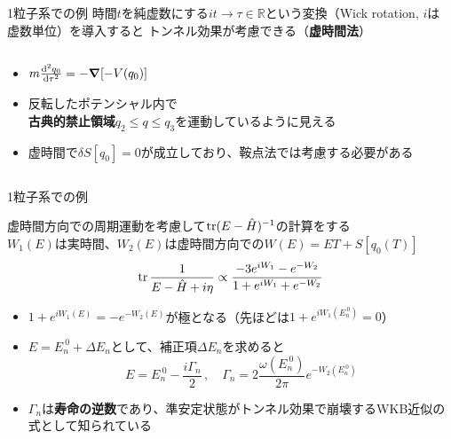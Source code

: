 \documentclass[14pt,aspectratio=169,xcolor=dvipsnames,table,dvipdfmx]{beamer}
\theoremstyle{definition}
\begin{document}
\begin{frame}{1粒子系での例}
  時間$t$を純虚数にする$it\to\tau\in \mathbb{R}$という変換（Wick rotation, $i$は\\虚数単位）を導入すると
  トンネル効果が考慮できる（\textbf{虚時間法}）
  \begin{columns}[t]
    \begin{column}{.49\textwidth}
      \begin{itemize}
        \item $m\dv[2]{q_0}{\tau} = -\grad \qty[-V(q_0)]$
        \item 反転したポテンシャル内で\\{\color{AlertOrange}\textbf{古典的禁止領域}}$q_2\leq q\leq q_3$を運動しているように見える
        \item 虚時間で$\delta S[q_0]=0$が成立しており、鞍点法では考慮する必要がある
      \end{itemize}
    \end{column}
    \begin{column}{.5\textwidth}
    \end{column}
  \end{columns}
\end{frame}

\begin{frame}{1粒子系での例}
  
  {\color{AlertOrange}虚時間方向での周期運動}を考慮して$\trace(E-\hat{H})^{-1}$の計算をする\\
  $W_1(E)$は実時間、$W_2(E)$は虚時間方向での$W(E)=ET+S[q_0(T)]$\\
  \begin{equation*}
    \trace\frac{1}{E-\hat{H}+i\eta} \propto \frac{-3e^{iW_1}-e^{-W_2}}{1+e^{iW_1}+e^{-W_2}}
  \end{equation*}
  \begin{itemize}
    \item $1+e^{iW_1(E)}=-e^{-W_2(E)}$が極となる（先ほどは$1+e^{iW_1(E_n^{~0})}=0$）
    \item $E=E_{n}^{~0}+\varDelta E_n$として、補正項$\varDelta E_n$を求めると
          \begin{equation*}
            E = E_{n}^{~0} -\frac{i\Gamma_n}{2}\,,\quad \Gamma_n = 2\frac{\omega(E_n^{~0})}{2\pi}e^{-W_2(E_n^{~0})}
          \end{equation*}
    \item $\Gamma_n$は\textbf{寿命の逆数}であり、準安定状態がトンネル効果で崩壊するWKB近似の式として知られている
  \end{itemize}
\end{frame}
\end{document}

